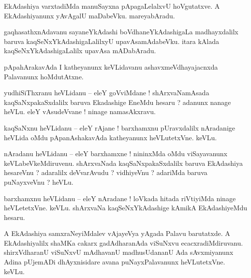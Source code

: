 \documentclass{article}
\begin{document}
\begin{mn}%
EkAdashiya varxtadiMda manuSayxna pApagaLelalxvU hoVgutatxve. A EkAdashiyanunx yAvAgalU maDabeVku. 
mareyabAradu.
\end{mn}

\begin{mn}%
gaqhasathxnAdavanu sayaneYkAdashi boVdhaneYkAdashigaLa madhayxdalilx baruva 
kaqSeNxYkAdashigaLalilxyU upavAsamAdabeVku. itara kAlada kaqSeNxYkAdashigaLalilx upavAsa mADabAradu.
\end{mn}

\begin{mn}%
pApahArakavAda I katheyanunx keVLidavanu ashavxmeVdhayajacnxda Palavanunx hoMdutAtxne.
\end{mn}


\begin{mn}%
yudhiSiThxranu heVLidanu -- eleY goVviMdane ! shArxvaNamAsada kaqSaNxpakaSxdalilx baruva Ekadashige 
EneMdu hesaru ? adanunx nanage heVLu. eleY vAsudeVvane ! ninage namasAkxravu.
\end{mn}

\begin{mn}%
kaqSaNxnu heVLidanu -- eleY rAjane ! barxhamxnu pUravxdalilx nAradanige heVLida oMdu 
pApanAshakavAda katheyanunx heVLutetxVne. keVLu.
\end{mn}

\begin{mn}%
nAradanu heVLidanu -- eleY barxhamxne ! nininxMda oMdu viSayavanunx keVLabeVkeMdiruvenu. 
shArxvaNada kaqSaNxpakaSxdalilx baruva EkAdashiya hesareVnu ? adaralilx deVvarAvudu ? vidhiyeVnu ? 
adariMda baruva puNayxveVnu ? heVLu.
\end{mn}

\begin{mn}%
barxhamxnu heVLidanu -- eleY nAradane ! loVkada hitada riVtiyiMda ninage heVLetetxVne. keVLu. 
shArxvaNa kaqSeNxYkAdashige kAmikA EkAdashiyeMdu hesaru.
\end{mn}

\begin{mn}%
A EkAdashiya samxraNeyiMdalev vAjayeVya yAgada Palavu barutatxde. A EkAdashiyalilx shaMKa cakarx 
gadAdharanAda viSuNxvu ecacxradiMdiruvanu. shirxVdharanU viSuNxvU mAdhavanU madhusUdananU Ada 
sAvxmiyanunx Adina pUjemADi dhAyxnisidare avana puNayxPalavanunx heVLutetxVne. keVLu.
\end{mn}
\end{document}
